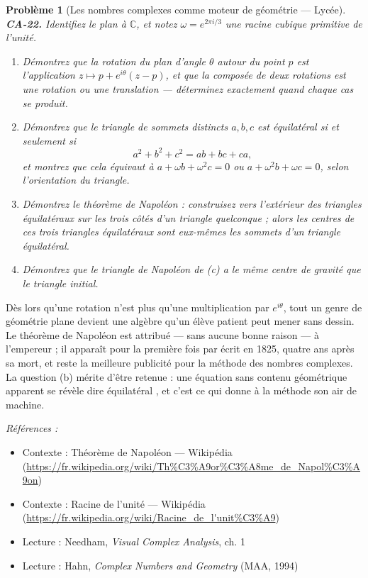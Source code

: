 \documentclass[11pt]{article}
\newtheorem{problem}{Problème}
\newenvironment{refs}{\par\small\noindent\emph{Références :}\begin{itemize}\setlength\itemsep{0pt}}{\end{itemize}\normalsize}
\begin{document}
\begin{problem}[{Les nombres complexes comme moteur de géométrie --- Lycée}]
\textbf{CA-22.} Identifiez le plan à $ \mathbb{C} $, et notez $ \omega = e^{2\pi i/3} $
une racine cubique primitive de l'unité.
\begin{enumerate}
\item[(a)] Démontrez que la rotation du plan d'angle $ \theta $ autour du point $ p $ est
l'application $ z \mapsto p + e^{i\theta}(z - p) $, et que la composée de deux rotations est une
rotation ou une translation --- déterminez exactement quand chaque cas se produit.
\item[(b)] Démontrez que le triangle de sommets distincts $ a, b, c $ est équilatéral si et seulement si
\[ a^2 + b^2 + c^2 = ab + bc + ca, \]
et montrez que cela équivaut à $ a + \omega b + \omega^2 c = 0 $ ou
$ a + \omega^2 b + \omega c = 0 $, selon l'orientation du triangle.
\item[(c)] Démontrez le théorème de Napoléon : construisez vers l'extérieur des triangles équilatéraux sur
les trois côtés d'un triangle quelconque ; alors les centres de ces trois triangles équilatéraux
sont eux-mêmes les sommets d'un triangle équilatéral.
\item[(d)] Démontrez que le triangle de Napoléon de (c) a le même centre de gravité que le triangle
initial.
\end{enumerate}

\end{problem}

\noindent Dès lors qu'une rotation n'est plus qu'une multiplication par $ e^{i\theta} $,
tout un genre de géométrie plane devient une algèbre qu'un élève patient peut mener sans dessin. Le
théorème de Napoléon est attribué --- sans aucune bonne raison --- à l'empereur ; il apparaît pour la
première fois par écrit en 1825, quatre ans après sa mort, et reste la meilleure publicité pour la
méthode des nombres complexes. La question (b) mérite d'être retenue : une équation sans contenu
géométrique apparent se révèle dire \og{} équilatéral \fg{}, et c'est ce qui donne à la méthode son air de
machine.

\begin{refs}
\item Contexte : Théorème de Napoléon --- Wikipédia (\url{https://fr.wikipedia.org/wiki/Th%C3%A9or%C3%A8me_de_Napol%C3%A9on})
\item Contexte : Racine de l'unité --- Wikipédia (\url{https://fr.wikipedia.org/wiki/Racine_de_l'unit%C3%A9})
\item Lecture : Needham, \textit{Visual Complex Analysis}, ch. 1
\item Lecture : Hahn, \textit{Complex Numbers and Geometry} (MAA, 1994)
\end{refs}
\end{document}
